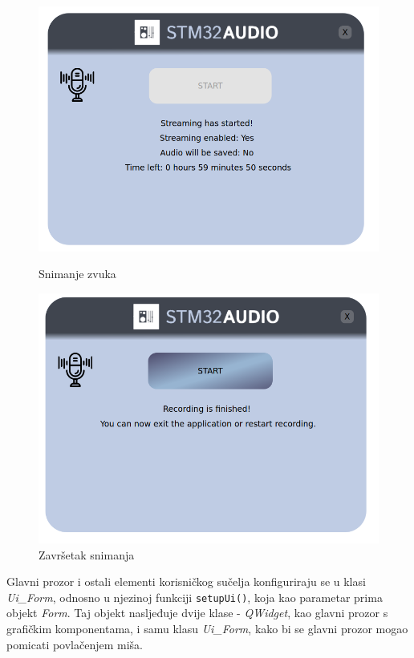 \begin{figure}[ht]
	\begin{minipage}[t]{0.4\textwidth}
	\includegraphics[width=\linewidth]{imgs/recording_form_3}
	\caption{Snimanje zvuka}
	\label{fig:recording_form_3}
	\end{minipage}
	\hspace*{\fill}
	\begin{minipage}[t]{0.4\textwidth}
		\includegraphics[width=\linewidth]{imgs/recording_form_4}
		\caption{Završetak snimanja}
		\label{fig:recording_form_4}
	\end{minipage}
\end{figure}


Glavni prozor i ostali elementi korisničkog sučelja konfiguriraju se u klasi \textit{Ui\_Form}, odnosno u njezinoj funkciji \lstinline|setupUi()|, koja kao parametar prima objekt \textit{Form}. Taj objekt nasljeđuje dvije klase - \textit{QWidget}, kao glavni prozor s grafičkim komponentama, i samu klasu \textit{Ui\_Form}, kako bi se glavni prozor mogao pomicati povlačenjem miša. 


